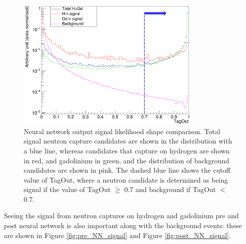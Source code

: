 \begin{figure}
    \centering
    \includegraphics[width=0.8\textwidth]{Figures/tagout.png}
    \caption{Neural network output signal likelihood shape comparison. Total signal neutron capture candidates are shown in the distribution with a blue line, whereas candidates that capture on hydrogen are shown in red, and gadolinium in green, and the distribution of background candidates are shown in pink. The dashed blue line shows the cutoff value of TagOut, where a neutron candidate is determined as being signal if the value of TagOut $\geq$ 0.7 and background if TagOut $<$ 0.7.}
    \label{fig:tagout}
\end{figure}


Seeing the signal from neutron captures on hydrogen and gadolinium pre and post neural network is also important along with the background events: these are shown in Figure \ref{fig:pre_NN_signal} and Figure \ref{fig:post_NN_signal}. 


